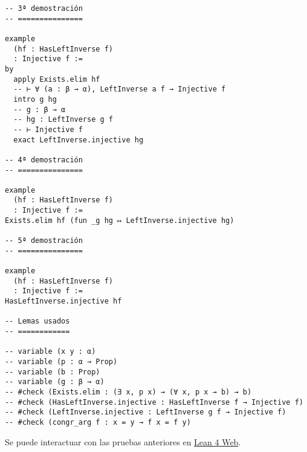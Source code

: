 \begin{verbatim}
-- 3ª demostración
-- ===============

example
  (hf : HasLeftInverse f)
  : Injective f :=
by
  apply Exists.elim hf
  -- ⊢ ∀ (a : β → α), LeftInverse a f → Injective f
  intro g hg
  -- g : β → α
  -- hg : LeftInverse g f
  -- ⊢ Injective f
  exact LeftInverse.injective hg

-- 4ª demostración
-- ===============

example
  (hf : HasLeftInverse f)
  : Injective f :=
Exists.elim hf (fun _g hg ↦ LeftInverse.injective hg)

-- 5ª demostración
-- ===============

example
  (hf : HasLeftInverse f)
  : Injective f :=
HasLeftInverse.injective hf

-- Lemas usados
-- ============

-- variable (x y : α)
-- variable (p : α → Prop)
-- variable (b : Prop)
-- variable (g : β → α)
-- #check (Exists.elim : (∃ x, p x) → (∀ x, p x → b) → b)
-- #check (HasLeftInverse.injective : HasLeftInverse f → Injective f)
-- #check (LeftInverse.injective : LeftInverse g f → Injective f)
-- #check (congr_arg f : x = y → f x = f y)
\end{verbatim}
Se puede interactuar con las pruebas anteriores en \href{https://lean.math.hhu.de/\#url=https://raw.githubusercontent.com/jaalonso/Calculemus2/main/src/Las\_funciones\_con\_inversa\_por\_la\_izquierda\_son\_inyectivas.lean}{Lean 4 Web}.


